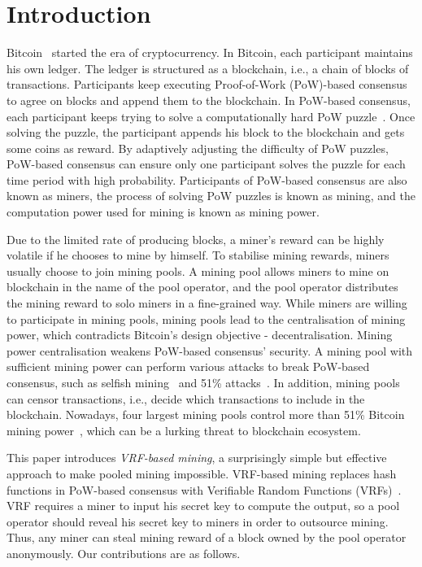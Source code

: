 \section{Introduction}
\label{sec:intro}

Bitcoin~\cite{nakamoto2008bitcoin} started the era of cryptocurrency.
In Bitcoin, each participant maintains his own ledger.
The ledger is structured as a blockchain, i.e., a chain of blocks of transactions.
Participants keep executing Proof-of-Work (PoW)-based consensus to agree on blocks and append them to the blockchain.
In PoW-based consensus, each participant keeps trying to solve a computationally hard PoW puzzle~\cite{dwork1992pricing}.
Once solving the puzzle, the participant appends his block to the blockchain and gets some coins as reward.
By adaptively adjusting the difficulty of PoW puzzles, PoW-based consensus can ensure only one participant solves the puzzle for each time period with high probability.
Participants of PoW-based consensus are also known as miners, the process of solving PoW puzzles is known as mining, and the computation power used for mining is known as mining power.

Due to the limited rate of producing blocks, a miner's reward can be highly volatile if he chooses to mine by himself.
To stabilise mining rewards, miners usually choose to join mining pools.
A mining pool allows miners to mine on blockchain in the name of the pool operator, and the pool operator distributes the mining reward to solo miners in a fine-grained way.
While miners are willing to participate in mining pools, mining pools lead to the centralisation of mining power, which contradicts Bitcoin's design objective - decentralisation.
Mining power centralisation weakens PoW-based consensus' security.
A mining pool with sufficient mining power can perform various attacks to break PoW-based consensus, such as selfish mining~\cite{eyal2018majority} and 51\% attacks~\cite{nakamoto2008bitcoin}.
In addition, mining pools can censor transactions, i.e., decide which transactions to include in the blockchain.
Nowadays, four largest mining pools control more than 51\% Bitcoin mining power~\cite{btc-com}, which can be a lurking threat to blockchain ecosystem.

This paper introduces \textit{VRF-based mining}, a surprisingly simple but effective approach to make pooled mining impossible.
VRF-based mining replaces hash functions in PoW-based consensus with Verifiable Random Functions (VRFs)~\cite{micali1999verifiable}.
VRF requires a miner to input his secret key to compute the output, so a pool operator should reveal his secret key to miners in order to outsource mining.
Thus, any miner can steal mining reward of a block owned by the pool operator anonymously.
Our contributions are as follows.

